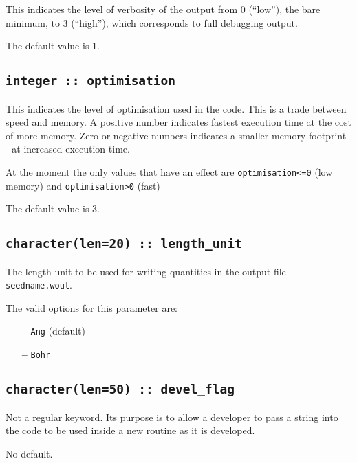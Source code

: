 This indicates the level of verbosity of the output from 0 (``low''),
the bare minimum, to 3 (``high''), which corresponds to full debugging output.

The default value is 1.

\subsection[optimisation]{\tt integer :: optimisation}

This indicates the level of optimisation used in the code. This is a
trade between speed and memory. A positive number indicates fastest execution time at the cost
of more memory. Zero or negative numbers indicates a smaller memory footprint - at increased
execution time.

At the moment the only values that have an effect are \verb#optimisation<=0# (low memory) and \verb#optimisation>0# (fast)

The default value is 3.



\subsection[length\_unit]{\tt character(len=20) :: length\_unit}
The length unit to be used for writing quantities in the output file
{\tt seedname.wout}.

The valid options for this parameter are:
\begin{itemize}
\item[{\bf --}]  \verb#Ang# (default)
\item[{\bf --}]  \verb#Bohr#
\end{itemize}

\subsection[devel\_flag]{\tt character(len=50) :: devel\_flag}

Not a regular keyword. Its purpose is to allow a developer to pass a
string into the code to be used inside a new routine as it is developed.

No default.

%
%


